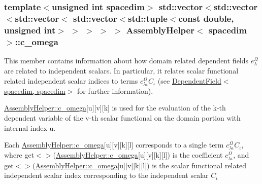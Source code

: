 \subsubsection[{\texorpdfstring{c\+\_\+omega}{c_omega}}]{\setlength{\rightskip}{0pt plus 5cm}template$<$unsigned int spacedim$>$ std\+::vector$<$std\+::vector$<$std\+::vector$<$ std\+::vector$<$std\+::tuple$<$const double, unsigned int$>$ $>$ $>$ $>$ $>$ {\bf Assembly\+Helper}$<$ spacedim $>$\+::c\+\_\+omega\hspace{0.3cm}{\ttfamily [private]}}\hypertarget{class_assembly_helper_a75e6f76c0b12b91c5feb230251f0137f}{}\label{class_assembly_helper_a75e6f76c0b12b91c5feb230251f0137f}
This member contains information about how domain related dependent fields $e^\Omega_\lambda$ are related to independent scalars. In particular, it relates scalar functional related independent scalar indices to terms $c^\Omega_{\lambda\iota} C_\iota$ (see \hyperlink{class_dependent_field_3_01spacedim_00_01spacedim_01_4}{Dependent\+Field$<$spacedim, spacedim$>$} for further information).

\hyperlink{class_assembly_helper_a75e6f76c0b12b91c5feb230251f0137f}{Assembly\+Helper\+::c\+\_\+omega}\mbox{[}{\ttfamily u}\mbox{]}\mbox{[}{\ttfamily v}\mbox{]}\mbox{[}{\ttfamily k}\mbox{]} is used for the evaluation of the {\ttfamily k-\/th} dependent variable of the {\ttfamily v-\/th} scalar functional on the domain portion with internal index {\ttfamily u}.

Each \hyperlink{class_assembly_helper_a75e6f76c0b12b91c5feb230251f0137f}{Assembly\+Helper\+::c\+\_\+omega}\mbox{[}{\ttfamily u}\mbox{]}\mbox{[}{\ttfamily v}\mbox{]}\mbox{[}{\ttfamily k}\mbox{]}\mbox{[}{\ttfamily l}\mbox{]} corresponds to a single term $c^\Omega_{\lambda\iota} C_\iota$, where {\ttfamily get$<${$>$}(\hyperlink{class_assembly_helper_a75e6f76c0b12b91c5feb230251f0137f}{Assembly\+Helper\+::c\+\_\+omega}}\mbox{[}{\ttfamily u}\mbox{]}\mbox{[}{\ttfamily v}\mbox{]}\mbox{[}{\ttfamily k}\mbox{]}\mbox{[}{\ttfamily l}\mbox{]}) is the coefficient $c^\Omega_{\lambda\iota}$, and {\ttfamily get$<${$>$}(\hyperlink{class_assembly_helper_a75e6f76c0b12b91c5feb230251f0137f}{Assembly\+Helper\+::c\+\_\+omega}}\mbox{[}{\ttfamily u}\mbox{]}\mbox{[}{\ttfamily v}\mbox{]}\mbox{[}{\ttfamily k}\mbox{]}\mbox{[}{\ttfamily l}\mbox{]}) is the scalar functional related independent scalar index corresponding to the independent scalar $C_\iota$ 
